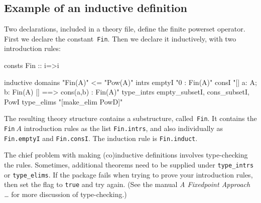 \subsection{Example of an inductive definition}

Two declarations, included in a theory file, define the finite powerset
operator.  First we declare the constant~\texttt{Fin}.  Then we declare it
inductively, with two introduction rules:
\begin{ttbox}
consts  Fin :: i=>i

inductive
  domains   "Fin(A)" <= "Pow(A)"
  intrs
    emptyI  "0 : Fin(A)"
    consI   "[| a: A;  b: Fin(A) |] ==> cons(a,b) : Fin(A)"
  type_intrs empty_subsetI, cons_subsetI, PowI
  type_elims "[make_elim PowD]"
\end{ttbox}
The resulting theory structure contains a substructure, called~\texttt{Fin}.
It contains the \texttt{Fin}$~A$ introduction rules as the list
\texttt{Fin.intrs}, and also individually as \texttt{Fin.emptyI} and
\texttt{Fin.consI}.  The induction rule is \texttt{Fin.induct}.

The chief problem with making (co)inductive definitions involves type-checking
the rules.  Sometimes, additional theorems need to be supplied under
\texttt{type_intrs} or \texttt{type_elims}.  If the package fails when trying
to prove your introduction rules, then set the flag 
to \texttt{true} and try again.  (See the manual \emph{A Fixedpoint Approach
  \ldots} for more discussion of type-checking.)

